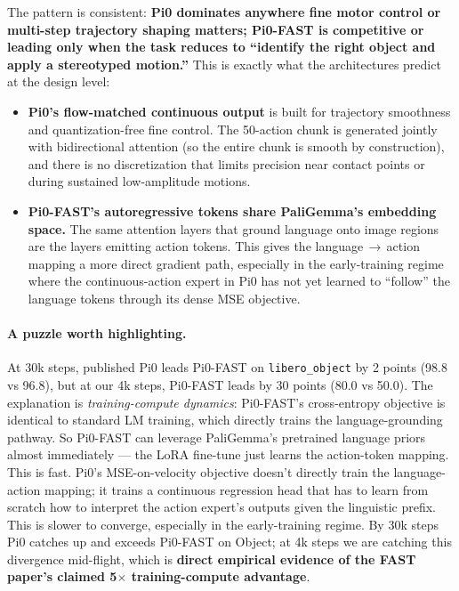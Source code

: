 \documentclass[11pt,letterpaper]{article}
\begin{document}
The pattern is consistent: \textbf{Pi0 dominates anywhere fine motor control or multi-step trajectory shaping matters; Pi0-FAST is competitive or leading only when the task reduces to ``identify the right object and apply a stereotyped motion.''} This is exactly what the architectures predict at the design level:

\begin{itemize}[noitemsep,topsep=2pt]
  \item \textbf{Pi0's flow-matched continuous output} is built for trajectory smoothness and quantization-free fine control. The 50-action chunk is generated jointly with bidirectional attention (so the entire chunk is smooth by construction), and there is no discretization that limits precision near contact points or during sustained low-amplitude motions.
  \item \textbf{Pi0-FAST's autoregressive tokens share PaliGemma's embedding space.} The same attention layers that ground language onto image regions are the layers emitting action tokens. This gives the language\,$\to$\,action mapping a more direct gradient path, especially in the early-training regime where the continuous-action expert in Pi0 has not yet learned to ``follow'' the language tokens through its dense MSE objective.
\end{itemize}

\paragraph{A puzzle worth highlighting.} At 30k steps, published Pi0 leads Pi0-FAST on \texttt{libero\_object} by 2 points (98.8 vs 96.8), but at our 4k steps, Pi0-FAST leads by 30 points (80.0 vs 50.0). The explanation is \emph{training-compute dynamics}: Pi0-FAST's cross-entropy objective is identical to standard LM training, which directly trains the language-grounding pathway. So Pi0-FAST can leverage PaliGemma's pretrained language priors almost immediately --- the LoRA fine-tune just learns the action-token mapping. This is fast. Pi0's MSE-on-velocity objective doesn't directly train the language-action mapping; it trains a continuous regression head that has to learn from scratch how to interpret the action expert's outputs given the linguistic prefix. This is slower to converge, especially in the early-training regime. By 30k steps Pi0 catches up and exceeds Pi0-FAST on Object; at 4k steps we are catching this divergence mid-flight, which is \textbf{direct empirical evidence of the FAST paper's claimed 5$\times$ training-compute advantage}.
\end{document}
